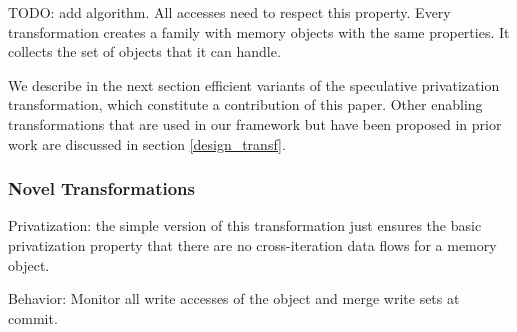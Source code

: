TODO: add algorithm. All accesses need to respect this property. Every
transformation creates a family with memory objects with the same
properties.  It collects the set of objects that it can handle.


We describe in the next section efficient variants of the speculative
privatization transformation, which constitute a contribution of this
paper.  Other enabling transformations that are used in our framework
but have been proposed in prior work are discussed in
section \ref{design_transf}.

\subsubsection{Novel Transformations}
\label{novel_transf}

%

Privatization: the simple version of this transformation just
ensures the basic privatization property that there are no
cross-iteration data flows for a memory object.

Behavior: Monitor all write accesses of the object and merge write
sets at commit.

